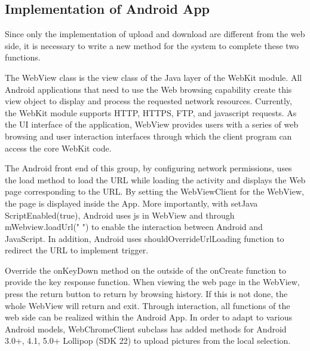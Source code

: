 \documentclass[a4paper,11pt]{article}
\begin{document}
\subsection{Implementation of Android App}
\par Since only the implementation of upload and download are different from the web side, it is necessary to write a new method for the system to complete these two functions. 
\par The WebView class is the view class of the Java layer of the WebKit module. All Android applications that need to use the Web browsing capability create this view object to display and process the requested network resources. Currently, the WebKit module supports HTTP, HTTPS, FTP, and javascript requests. As the UI interface of the application, WebView provides users with a series of web browsing and user interaction interfaces through which the client program can access the core WebKit code.
\par The Android front end of this group, by configuring network permissions, uses the load method to load the URL while loading the activity and displays the Web page corresponding to the URL. By setting the WebViewClient for the WebView, the page is displayed inside the App. More importantly, with setJava ScriptEnabled(true), Android uses js in WebView and through mWebview.loadUrl(" ")
to enable the interaction between Android and JavaScript. In addition, Android uses shouldOverrideUrlLoading function to redirect the URL to implement trigger.
\par Override the onKeyDown method on the outside of the onCreate function to provide the key response function. When viewing the web page in the WebView, press the return button to return by browsing history. If this is not done, the whole WebView will return and exit. Through interaction, all functions of the web side can be realized within the Android App. In order to adapt to various Android models, WebChromeClient subclass has added methods for Android 3.0+, 4.1, 5.0+ Lollipop (SDK 22) to upload pictures from the local selection.
\end{document}
